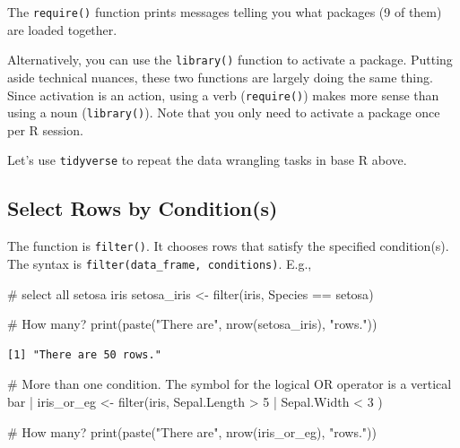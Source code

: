 \documentclass[
  letterpaper,
  DIV=11,
  numbers=noendperiod]{scrreprt}
\newenvironment{Shaded}{\begin{snugshade}}{\end{snugshade}}
\newcommand{\CommentTok}[1]{\textcolor[rgb]{0.37,0.37,0.37}{#1}}
\newcommand{\DecValTok}[1]{\textcolor[rgb]{0.68,0.00,0.00}{#1}}
\newcommand{\FunctionTok}[1]{\textcolor[rgb]{0.28,0.35,0.67}{#1}}
\newcommand{\NormalTok}[1]{\textcolor[rgb]{0.00,0.23,0.31}{#1}}
\newcommand{\OtherTok}[1]{\textcolor[rgb]{0.00,0.23,0.31}{#1}}
\newcommand{\SpecialCharTok}[1]{\textcolor[rgb]{0.37,0.37,0.37}{#1}}
\newcommand{\StringTok}[1]{\textcolor[rgb]{0.13,0.47,0.30}{#1}}
\begin{document}
The \texttt{require()} function prints messages telling you what
packages (9 of them) are loaded together.

Alternatively, you can use the \texttt{library()} function to activate a
package. Putting aside technical nuances, these two functions are
largely doing the same thing. Since activation is an action, using a
verb (\texttt{require()}) makes more sense than using a noun
(\texttt{library()}). Note that you only need to activate a package once
per R session.

Let's use \texttt{tidyverse} to repeat the data wrangling tasks in base
R above.

\subsection{Select Rows by
Condition(s)}\label{select-rows-by-conditions-1}

The function is \texttt{filter()}. It chooses rows that satisfy the
specified condition(s). The syntax is
\texttt{filter(data\_frame,\ conditions)}. E.g.,

\begin{Shaded}
\begin{Highlighting}[]
\CommentTok{\# select all setosa iris}
\NormalTok{setosa\_iris }\OtherTok{\textless{}{-}} \FunctionTok{filter}\NormalTok{(iris, Species }\SpecialCharTok{==} \StringTok{\textquotesingle{}setosa\textquotesingle{}}\NormalTok{)}

\CommentTok{\# How many?}
\FunctionTok{print}\NormalTok{(}\FunctionTok{paste}\NormalTok{(}\StringTok{"There are"}\NormalTok{, }\FunctionTok{nrow}\NormalTok{(setosa\_iris), }\StringTok{"rows."}\NormalTok{))}
\end{Highlighting}
\end{Shaded}

\begin{verbatim}
[1] "There are 50 rows."
\end{verbatim}

\begin{Shaded}
\begin{Highlighting}[]
\CommentTok{\# More than one condition. The symbol for the logical OR operator is a vertical bar |}
\NormalTok{iris\_or\_eg }\OtherTok{\textless{}{-}} \FunctionTok{filter}\NormalTok{(iris, Sepal.Length }\SpecialCharTok{\textgreater{}} \DecValTok{5} \SpecialCharTok{|}\NormalTok{ Sepal.Width }\SpecialCharTok{\textless{}} \DecValTok{3}\NormalTok{ )}

\CommentTok{\# How many?}
\FunctionTok{print}\NormalTok{(}\FunctionTok{paste}\NormalTok{(}\StringTok{"There are"}\NormalTok{, }\FunctionTok{nrow}\NormalTok{(iris\_or\_eg), }\StringTok{"rows."}\NormalTok{))}
\end{Highlighting}
\end{Shaded}
\end{document}
